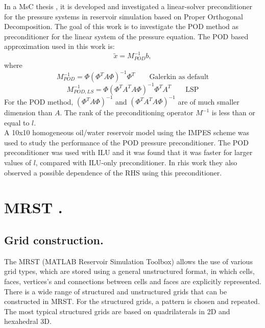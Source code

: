 \documentclass[12pt]{report}
\begin{document}
In a MsC thesis \cite{Jiang13}, it is developed and investigated a linear-solver preconditioner for the pressure systems 
in reservoir simulation based on Proper Orthogonal Decomposition.
The goal of this work is to investigate the POD method as preconditioner for the linear system of the pressure equation.
The POD based approximation used in this work is:
$$\tilde{x}=M^{-1}_{POD}b,$$ where
\begin{equation}
 M^{-1}_{POD}=\Phi(\Phi^TA\Phi)^{-1}\Phi^T \qquad \text{Galerkin as default}
\end{equation}
\begin{equation}
 M^{-1}_{POD,LS}=\Phi(\Phi^TA^TA\Phi)^{-1}\Phi^TA^T \qquad \text{LSP}
\end{equation}
For the POD method, $(\Phi^TA\Phi)^{-1}$ and $(\Phi^TA^TA\Phi)^{-1}$ are of much smaller 
dimension than $A$.
The rank of the preconditioning operator $M^{-1}$ is less than or equal to $l$.\\
A 10x10 homogeneous oil/water reservoir model using the IMPES scheme was used to study the performance of
the POD pressure preconditioner. The POD preconditioner was used with ILU and it was found that it was
faster for larger values of $l$, compared with ILU-only preconditioner. In rhis work they also observed a possible dependence
of the RHS using this preconditioner.
\appendix
\chapter{MRST \cite{Lie13}.}
\section*{Grid construction.}
The MRST (MATLAB Reservoir Simulation Toolbox) allows the use of various grid types, which are stored using a general unstructured
format, in which cells, faces, vertices's and connections between cells and faces are explicitly
represented. \\
There is a wide range of structured and unstructured grids that can be constructed in MRST.
For the structured grids, a pattern is chosen and repeated. The most typical structured grids are 
based on quadrilaterals in 2D and hexahedral 3D.
\end{document}
